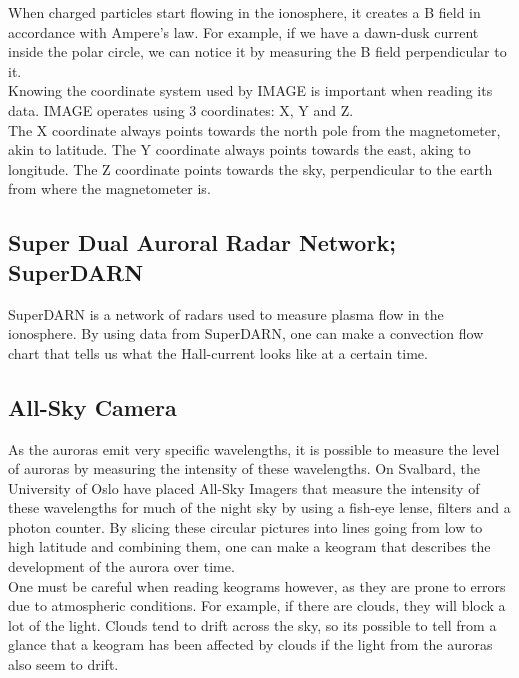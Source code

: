 \documentclass[norsk,a4paper,12pt]{article}
\begin{document}
\begin{multicols}{2}
When charged particles start flowing in the ionosphere, it creates a B field in accordance with Ampere's law. For example, if we have a dawn-dusk current inside the polar circle, we can notice it by measuring the B field perpendicular to it.\\
Knowing the coordinate system used by IMAGE is important when reading its data. IMAGE operates using 3 coordinates: X, Y and Z.\\
The X coordinate always points towards the north pole from the magnetometer, akin to latitude. The Y coordinate always points towards the east, aking to longitude. The Z coordinate points towards the sky, perpendicular to the earth from where the magnetometer is.

\subsection{Super Dual Auroral Radar Network; SuperDARN}
SuperDARN is a network of radars used to measure plasma flow in the ionosphere. By using data from SuperDARN, one can make a convection flow chart that tells us what the Hall-current looks like at a certain time.

\subsection{All-Sky Camera}
As the auroras emit very specific wavelengths, it is possible to measure the level of auroras by measuring the intensity of these wavelengths. On Svalbard, the University of Oslo have placed All-Sky Imagers that measure the intensity of these wavelengths for much of the night sky by using a fish-eye lense, filters and a photon counter. By slicing these circular pictures into lines going from low to high latitude and combining them, one can make a keogram that describes the development of the aurora over time.\\
One must be careful when reading keograms however, as they are prone to errors due to atmospheric conditions. For example, if there are clouds, they will block a lot of the light. Clouds tend to drift across the sky, so its possible to tell from a glance that a keogram has been affected by clouds if the light from the auroras also seem to drift.


\end{multicols}
\end{document}
